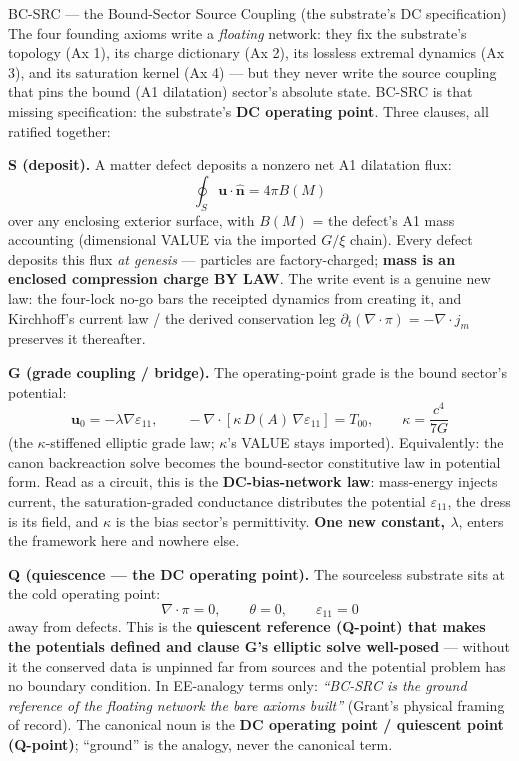 \begin{resultbox}{BC-SRC — the Bound-Sector Source Coupling (the substrate's DC specification)}
The four founding axioms write a \emph{floating} network: they fix the substrate's topology (Ax 1), its charge dictionary (Ax 2), its lossless extremal dynamics (Ax 3), and its saturation kernel (Ax 4) --- but they never write the source coupling that pins the bound (A1 dilatation) sector's absolute state. BC-SRC is that missing specification: the substrate's \textbf{DC operating point}. Three clauses, all ratified together:

\medskip\noindent\textbf{S (deposit).} A matter defect deposits a nonzero net A1 dilatation flux:
\begin{equation}
    \oint_S \mathbf{u}\cdot\hat{\mathbf{n}} = 4\pi B(M)
    \label{eq:bcsrc_deposit}
\end{equation}
over any enclosing exterior surface, with $B(M)$ = the defect's A1 mass accounting (dimensional VALUE via the imported $G/\xi$ chain). Every defect deposits this flux \emph{at genesis} --- particles are factory-charged; \textbf{mass is an enclosed compression charge BY LAW}. The write event is a genuine new law: the four-lock no-go bars the receipted dynamics from creating it, and Kirchhoff's current law / the derived conservation leg $\partial_t(\nabla\cdot\pi) = -\nabla\cdot j_m$ preserves it thereafter.

\medskip\noindent\textbf{G (grade coupling / bridge).} The operating-point grade is the bound sector's potential:
\begin{equation}
    \mathbf{u}_0 = -\lambda\nabla\varepsilon_{11},\qquad
    -\nabla\cdot\!\left[\kappa\, D(A)\,\nabla\varepsilon_{11}\right] = T_{00},\qquad
    \kappa = \frac{c^4}{7G}
    \label{eq:bcsrc_bridge}
\end{equation}
(the $\kappa$-stiffened elliptic grade law; $\kappa$'s VALUE stays imported). Equivalently: the canon backreaction solve becomes the bound-sector constitutive law in potential form. Read as a circuit, this is the \textbf{DC-bias-network law}: mass-energy injects current, the saturation-graded conductance distributes the potential $\varepsilon_{11}$, the dress is its field, and $\kappa$ is the bias sector's permittivity. \textbf{One new constant, $\lambda$}, enters the framework here and nowhere else.

\medskip\noindent\textbf{Q (quiescence --- the DC operating point).} The sourceless substrate sits at the cold operating point:
\begin{equation}
    \nabla\cdot\pi = 0,\qquad \theta = 0,\qquad \varepsilon_{11} = 0
    \label{eq:bcsrc_quiescence}
\end{equation}
away from defects. This is the \textbf{quiescent reference (Q-point) that makes the potentials defined and clause G's elliptic solve well-posed} --- without it the conserved data is unpinned far from sources and the potential problem has no boundary condition. In EE-analogy terms only: \emph{``BC-SRC is the ground reference of the floating network the bare axioms built''} (Grant's physical framing of record). The canonical noun is the \textbf{DC operating point / quiescent point (Q-point)}; ``ground'' is the analogy, never the canonical term.


\end{resultbox}
